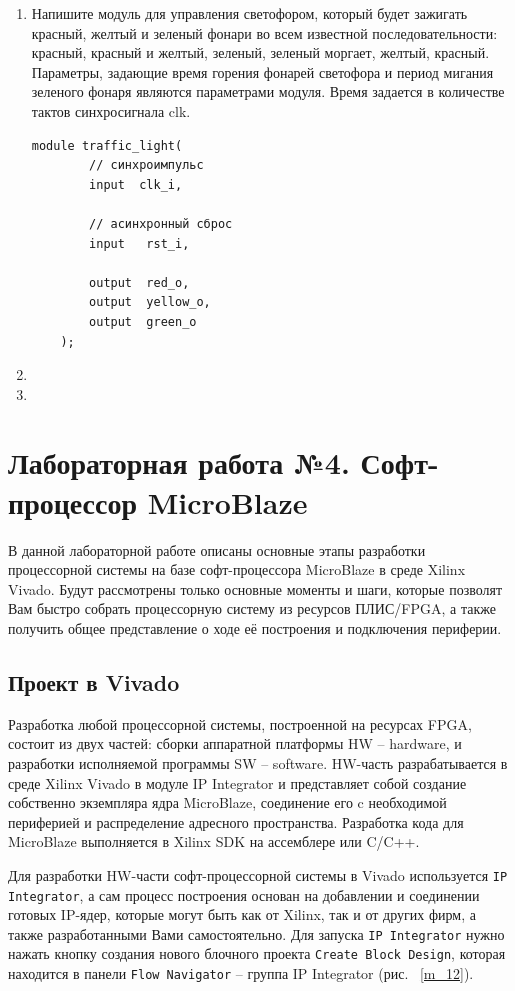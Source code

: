 \documentclass[a4paper,oneside ,10pt]{extreport}
\begin{document}
\begin{enumerate}
	\item Напишите модуль для управления светофором, который будет зажигать красный, желтый и зеленый фонари во всем известной последовательности: красный, красный и желтый, зеленый, зеленый моргает, желтый, красный. Параметры, задающие время горения фонарей светофора и период мигания зеленого фонаря являются параметрами модуля. Время задается в количестве тактов синхросигнала clk.
	\begin{Verbatim}[tabsize=4]
	module traffic_light(
		// cинхроимпульс
	  	input  clk_i,
	
	  	// асинхронный сброс
	  	input   rst_i,
	
	  	output  red_o,
	  	output  yellow_o,
	  	output  green_o
	);
	\end{Verbatim}
	\item 
	\item
\end{enumerate}

\chapter{Лабораторная работа №4. Софт-процессор MicroBlaze}

В данной лабораторной работе описаны основные этапы разработки процессорной системы на 
базе софт-процессора MicroBlaze в среде Xilinx Vivado. Будут рассмотрены
только основные моменты и шаги, которые позволят Вам быстро собрать 
процессорную систему из ресурсов ПЛИС/FPGA, а также получить общее 
представление о ходе её построения и подключения периферии.

\section{Проект в Vivado}

Разработка любой процессорной системы, построенной на ресурсах FPGA,
состоит из двух частей: сборки аппаратной платформы HW – hardware, и разработки исполняемой программы SW – software.
HW-часть разрабатывается в среде Xilinx Vivado в модуле IP Integrator
и представляет собой создание собственно экземпляра ядра MicroBlaze, соединение его c необходимой 
периферией и распределение адресного пространства. Разработка кода для 
MicroBlaze выполняется в Xilinx SDK на ассемблере или C/C++.

Для разработки HW-части софт-процессорной системы в Vivado используется 
\verb|IP Integrator|, а сам процесс построения основан на добавлении и соединении 
готовых IP-ядер, которые могут быть как от Xilinx, так и от других фирм, а также 
разработанными Вами самостоятельно. Для запуска \verb|IP Integrator| нужно нажать 
кнопку создания нового блочного проекта \verb|Create Block Design|, которая находится в 
панели \verb|Flow Navigator| – группа IP Integrator (рис. ~\ref{m_12}).
\end{document}
